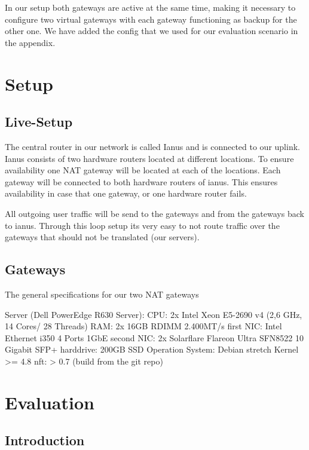 \documentclass{report}
\begin{document}
In our setup both gateways are active at the same time, making it
necessary to configure two virtual gateways with each gateway
functioning as backup for the other one. We have added the config that
we used for our evaluation scenario in the appendix.


\chapter{Setup}\label{setup}

\section{Live-Setup}\label{live-setup}

The central router in our network is called Ianus and is connected to
our uplink. Ianus consists of two hardware routers located at different
locations. To ensure availability one NAT gateway will be located at
each of the locations. Each gateway will be connected to both hardware
routers of ianus. This ensures availability in case that one gateway, or
one hardware router fails.

All outgoing user traffic will be send to the gateways and from the
gateways back to ianus. Through this loop setup its very easy to not
route traffic over the gateways that should not be translated (our
servers).

\section{Gateways}\label{gateways}

The general specifications for our two NAT gateways

Server (Dell PowerEdge R630 Server): CPU: 2x Intel Xeon E5-2690 v4 (2,6
GHz, 14 Cores/ 28 Threads) RAM: 2x 16GB RDIMM 2.400MT/s first NIC: Intel
Ethernet i350 4 Ports 1GbE second NIC: 2x Solarflare Flareon Ultra
SFN8522 10 Gigabit SFP+ harddrive: 200GB SSD Operation System: Debian
stretch Kernel \textgreater{}= 4.8 nft: \textgreater{} 0.7 (build from
the git repo)

\chapter{Evaluation}\label{evaluation}

\section{Introduction}\label{introduction-1}
\end{document}
